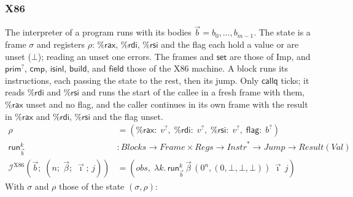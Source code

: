 \documentclass[10pt]{article}
\theoremstyle{acmplain}
\newcommand{\key}[1]{\mathsf{#1}}
\newcommand{\obs}{\mathit{obs}}
\newcommand{\Interp}[1]{\mathcal{I}^{#1}}
\newcommand{\rax}{\%\key{rax}}
\newcommand{\rdi}{\%\key{rdi}}
\newcommand{\rsi}{\%\key{rsi}}
\begin{document}
\subsubsection{X86}

The interpreter of a program runs with its bodies $\vec{b} = b_0, \ldots, b_{m-1}$.
The state is a frame $\sigma$ and registers $\rho$: $\rax$, $\rdi$, $\rsi$
and the flag each hold a value or are unset ($\bot$); reading an unset
one errors. The frames and $\key{set}$ are those
of Imp, and $\key{prim}^?$, $\key{cmp}$, $\key{isinl}$, $\key{build}$, and
$\key{field}$ those of the X86 machine. A block runs its instructions,
each passing the state to the rest, then its jump. Only $\key{callq}$
ticks; it reads $\rdi$ and $\rsi$ and runs the start of the callee in a
fresh frame with them, $\rax$ unset and no flag, and the caller continues in its own frame with the
result in $\rax$ and $\rdi$, $\rsi$ and the flag unset.
\begin{align*}
  \rho &= (\rax{:}\; v^?,\; \rdi{:}\; v^?,\; \rsi{:}\; v^?,\; \key{flag}{:}\; b^?) \\
  \key{run}^k_{\vec{b}} &: \mathit{Blocks} \to \mathit{Frame} \times \mathit{Regs} \to \mathit{Instr}^* \to \mathit{Jump} \to \mathit{Result}(\mathit{Val}) \\
  \Interp{\mathrm{X86}}(\vec{b};\; (n;\; \vec{\beta};\; \vec{\imath};\, j)) &=
    (\obs,\; \lambda k.\, \key{run}^k_{\vec{b}}\,\vec{\beta}\,(0^n, (0, \bot, \bot, \bot))\,\vec{\imath}\,j)
\end{align*}
With $\sigma$ and $\rho$ those of the state $(\sigma, \rho)$:
\end{document}
